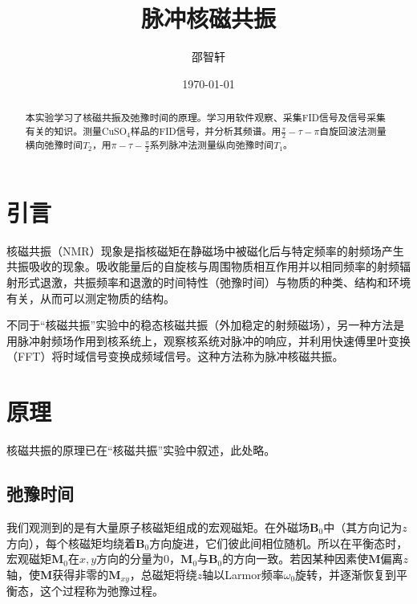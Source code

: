 \documentclass[aps,pre,12pt,preprint,onecolumn,showpacs,showkeys]{revtex4-1}
\begin{document}
\title{\bf\heiti{}脉冲核磁共振\vspace{15mm}}
\author{\fangsong{}邵智轩\vspace{2mm}}
\date{\today}

\begin{abstract}
\vspace{10mm}
\begin{spacing}{1.5}
\songti{}
    本实验学习了核磁共振及弛豫时间的原理。学习用软件观察、采集FID信号及信号采集有关的知识。测量CuSO$_4$样品的FID信号，并分析其频谱。用$\frac{\pi}{2}-\tau-\pi$自旋回波法测量横向弛豫时间$T_2$，用$\pi-\tau-\frac{\pi}{2}$系列脉冲法测量纵向弛豫时间$T_1$。

\end{spacing}
\end{abstract}
\maketitle
\songti{}

\section{引言}
    核磁共振（NMR）现象是指核磁矩在静磁场中被磁化后与特定频率的射频场产生共振吸收的现象。吸收能量后的自旋核与周围物质相互作用并以相同频率的射频辐射形式退激，共振频率和退激的时间特性（弛豫时间）与物质的种类、结构和环境有关，从而可以测定物质的结构。

    不同于“核磁共振”实验中的稳态核磁共振（外加稳定的射频磁场），另一种方法是用脉冲射频场作用到核系统上，观察核系统对脉冲的响应，并利用快速傅里叶变换（FFT）将时域信号变换成频域信号。这种方法称为脉冲核磁共振。

\section{原理}
    核磁共振的原理已在“核磁共振”实验中叙述，此处略。
    \subsection{弛豫时间}
        我们观测到的是有大量原子核磁矩组成的宏观磁矩。在外磁场$\bm B _0$中（其方向记为$z$方向），每个核磁矩均绕着$\bm B _0$方向旋进，它们彼此间相位随机。所以在平衡态时，宏观磁矩$\bm M_0$在$x,y$方向的分量为0，$\bm M_0$与$\bm B_0$的方向一致。若因某种因素使$\bm M$偏离$z$轴，使$\bm M$获得非零的$\bm M_{xy}$，总磁矩将绕$z$轴以Larmor频率$\omega_0$旋转，并逐渐恢复到平衡态，这个过程称为弛豫过程。
\end{document}

